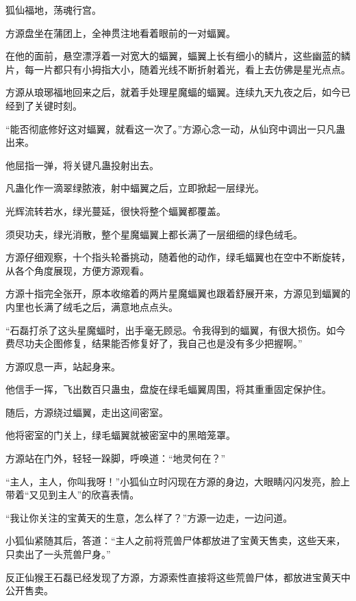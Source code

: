 
\begin{this_body}

狐仙福地，荡魂行宫。

方源盘坐在蒲团上，全神贯注地看着眼前的一对蝠翼。

在他的面前，悬空漂浮着一对宽大的蝠翼，蝠翼上长有细小的鳞片，这些幽蓝的鳞片，每一片都只有小拇指大小，随着光线不断折射着光，看上去仿佛是星光点点。

方源从琅琊福地回来之后，就着手处理星魔蝠的蝠翼。连续九天九夜之后，如今已经到了关键时刻。

“能否彻底修好这对蝠翼，就看这一次了。”方源心念一动，从仙窍中调出一只凡蛊出来。

他屈指一弹，将关键凡蛊投射出去。

凡蛊化作一滴翠绿脓液，射中蝠翼之后，立即掀起一层绿光。

光辉流转若水，绿光蔓延，很快将整个蝠翼都覆盖。

须臾功夫，绿光消散，整个星魔蝠翼上都长满了一层细细的绿色绒毛。

方源仔细观察，十个指头轮番挑动，随着他的动作，绿毛蝠翼也在空中不断旋转，从各个角度展现，方便方源观看。

方源十指完全张开，原本收缩着的两片星魔蝠翼也跟着舒展开来，方源见到蝠翼的内里也长满了绒毛之后，满意地点点头。

“石磊打杀了这头星魔蝠时，出手毫无顾忌。令我得到的蝠翼，有很大损伤。如今费尽功夫企图修复，结果能否修复好了，我自己也是没有多少把握啊。”

方源叹息一声，站起身来。

他信手一挥，飞出数百只蛊虫，盘旋在绿毛蝠翼周围，将其重重固定保护住。

随后，方源绕过蝠翼，走出这间密室。

他将密室的门关上，绿毛蝠翼就被密室中的黑暗笼罩。

方源站在门外，轻轻一跺脚，呼唤道：“地灵何在？”

“主人，主人，你叫我呀！”小狐仙立时闪现在方源的身边，大眼睛闪闪发亮，脸上带着“又见到主人”的欣喜表情。

“我让你关注的宝黄天的生意，怎么样了？”方源一边走，一边问道。

小狐仙紧随其后，答道：“主人之前将荒兽尸体都放进了宝黄天售卖，这些天来，只卖出了一头荒兽尸身。”

反正仙猴王石磊已经发现了方源，方源索性直接将这些荒兽尸体，都放进宝黄天中公开售卖。


\end{this_body}
